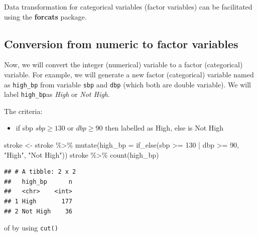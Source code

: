 \documentclass[
  10pt,
]{krantz}
\newenvironment{Shaded}{\begin{snugshade}}{\end{snugshade}}
\newcommand{\AttributeTok}[1]{\textcolor[rgb]{0.77,0.63,0.00}{#1}}
\newcommand{\DecValTok}[1]{\textcolor[rgb]{0.00,0.00,0.81}{#1}}
\newcommand{\FunctionTok}[1]{\textcolor[rgb]{0.00,0.00,0.00}{#1}}
\newcommand{\NormalTok}[1]{#1}
\newcommand{\OtherTok}[1]{\textcolor[rgb]{0.56,0.35,0.01}{#1}}
\newcommand{\SpecialCharTok}[1]{\textcolor[rgb]{0.00,0.00,0.00}{#1}}
\newcommand{\StringTok}[1]{\textcolor[rgb]{0.31,0.60,0.02}{#1}}
\providecommand{\tightlist}{%
  \setlength{\itemsep}{0pt}\setlength{\parskip}{0pt}}
\begin{document}
Data transformation for categorical variables (factor variables) can be facilitated using the \textbf{forcats} package.

\hypertarget{conversion-from-numeric-to-factor-variables}{%
\subsection{\texorpdfstring{Conversion from numeric to factor variables}{Conversion from numeric to factor variables}}\label{conversion-from-numeric-to-factor-variables}}

Now, we will convert the integer (numerical) variable to a factor (categorical) variable. For example, we will generate a new factor (categorical) variable named as \texttt{high\_bp} from variable \texttt{sbp} and \texttt{dbp} (which both are double variable). We will label \texttt{high\_bp}as \emph{High} or \emph{Not High}.

The criteria:

\begin{itemize}
\tightlist
\item
  if sbp \(sbp \geq 130\) or \(dbp \geq 90\) then labelled as High, else is Not High
\end{itemize}

\begin{Shaded}
\begin{Highlighting}[]
\NormalTok{stroke }\OtherTok{\textless{}{-}}\NormalTok{ stroke }\SpecialCharTok{\%\textgreater{}\%} 
  \FunctionTok{mutate}\NormalTok{(}\AttributeTok{high\_bp =} \FunctionTok{if\_else}\NormalTok{(sbp }\SpecialCharTok{\textgreater{}=} \DecValTok{130} \SpecialCharTok{|}\NormalTok{ dbp }\SpecialCharTok{\textgreater{}=} \DecValTok{90}\NormalTok{, }\StringTok{"High"}\NormalTok{, }\StringTok{"Not High"}\NormalTok{))}
\NormalTok{stroke }\SpecialCharTok{\%\textgreater{}\%} \FunctionTok{count}\NormalTok{(high\_bp)}
\end{Highlighting}
\end{Shaded}

\begin{verbatim}
## # A tibble: 2 x 2
##   high_bp      n
##   <chr>    <int>
## 1 High       177
## 2 Not High    36
\end{verbatim}

of by using \texttt{cut()}
\end{document}
